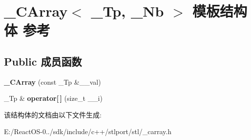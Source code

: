 \hypertarget{struct___c_array}{}\section{\+\_\+\+C\+Array$<$ \+\_\+\+Tp, \+\_\+\+Nb $>$ 模板结构体 参考}
\label{struct___c_array}
\subsection*{Public 成员函数}
\begin{DoxyCompactItemize}
\item 
\mbox{\label{struct___c_array_a014f838f8f72f5eb935d48e36e3b47b9}} 
{\bfseries \+\_\+\+C\+Array} (const \+\_\+\+Tp \&\+\_\+\+\_\+val)
\item 
\mbox{\label{struct___c_array_a98e3eff8894d87d19c4236352a1d75d9}} 
\+\_\+\+Tp \& {\bfseries operator\mbox{[}$\,$\mbox{]}} (size\+\_\+t \+\_\+\+\_\+i)
\end{DoxyCompactItemize}


该结构体的文档由以下文件生成\+:\begin{DoxyCompactItemize}
\item 
E\+:/\+React\+O\+S-\/0../sdk/include/c++/stlport/stl/\+\_\+carray.\+h\end{DoxyCompactItemize}
